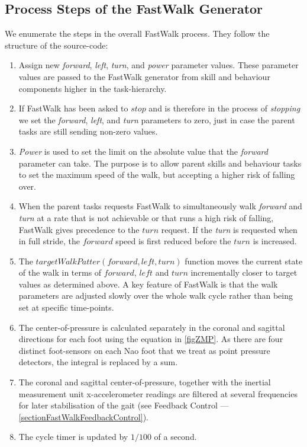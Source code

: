 \documentclass[pdftex,11pt,a4paper]{report}
\begin{document}
\subsection{Process Steps of the FastWalk Generator}
We enumerate the steps in the overall FastWalk process. They follow the structure of the source-code:
\begin{enumerate}
\item Assign new \emph{forward}, \emph{left}, \emph{turn}, and \emph{power} parameter values. These parameter values are passed to the FastWalk generator from skill and behaviour components higher in the task-hierarchy.
\item If FastWalk has been asked to $stop$ and is therefore in the process of \emph{stopping} we set the \emph{forward}, \emph{left}, and \emph{turn} parameters to zero, just in case the parent tasks are still sending non-zero values. 
\item \emph{Power} is used to set the limit on the absolute value that the \emph{forward} parameter can take. The purpose is to allow parent skills and behaviour tasks to set the maximum speed of the walk, but accepting a higher risk of falling over. 
\item When the parent tasks requests FastWalk to simultaneously walk \emph{forward} and \emph{turn} at a rate that is not achievable or that runs a high risk of falling, FastWalk gives precedence to the $turn$ request. If the \emph{turn} is requested when in full stride, the $forward$ speed is first reduced before the $turn$ is increased.
\item The $targetWalkPatter(forward, left, turn)$ function moves the current state of the walk in terms of $forward$, $left$ and $turn$ incrementally closer to target values as determined above. A key feature of FastWalk is that the walk parameters are adjusted slowly over the whole walk cycle rather than being set at specific time-points. 
\item The center-of-pressure is calculated separately in the coronal and sagittal directions for each foot using the equation in \autoref{figZMP}. As there are four distinct foot-sensors on each Nao foot that we treat as point pressure detectors, the integral is replaced by a sum.
\item The coronal and sagittal center-of-pressure, together with the inertial measurement unit x-accelerometer readings are filtered at several frequencies for later stabilisation of the gait (see Feedback Control --- \autoref{sectionFastWalkFeedbackControl}).
\item The cycle timer is updated by $1/100$ of a second.

\end{enumerate}
\end{document}
